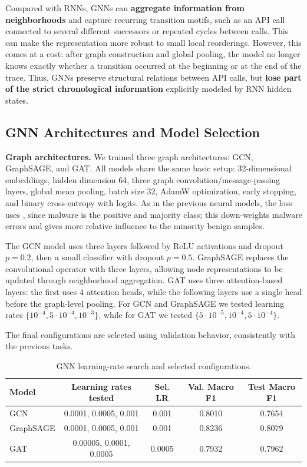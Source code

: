 Compared with RNNs, GNNs can \textbf{aggregate information from neighborhoods} and capture recurring transition motifs, such as an API call connected to several different successors or repeated cycles between calls. This can make the representation more robust to small local reorderings. However, this comes at a cost: after graph construction and global pooling, the model no longer knows exactly whether a transition occurred at the beginning or at the end of the trace. Thus, GNNs preserve structural relations between API calls, but \textbf{lose part of the strict chronological information} explicitly modeled by RNN hidden states.

\subsection{GNN Architectures and Model Selection} \label{subsec:task4_models}

\textbf{Graph architectures.} We trained three graph architectures: GCN, GraphSAGE, and GAT. All models share the same basic setup: 32-dimensional embeddings, hidden dimension 64, three graph convolution/message-passing layers, global mean pooling, batch size 32, AdamW optimization, early stopping, and binary cross-entropy with logits. As in the previous neural models, the loss uses , since malware is the positive and majority class; this down-weights malware errors and gives more relative influence to the minority benign samples.

The GCN model uses three  layers followed by ReLU activations and dropout $p=0.2$, then a small classifier with dropout $p=0.5$. GraphSAGE replaces the convolutional operator with three  layers, allowing node representations to be updated through neighborhood aggregation. GAT uses three attention-based layers: the first  uses 4 attention heads, while the following layers use a single head before the graph-level pooling. For GCN and GraphSAGE we tested learning rates $\{10^{-4}, 5\cdot10^{-4}, 10^{-3}\}$, while for GAT we tested $\{5\cdot10^{-5}, 10^{-4}, 5\cdot10^{-4}\}$.

The final configurations are selected using validation behavior, consistently with the previous tasks.

\begin{table}[H]
\small
\centering
\setlength{\tabcolsep}{5pt}
\renewcommand{\arraystretch}{1.05}
\caption{GNN learning-rate search and selected configurations.}
\label{tab:task4_configs}
\begin{tabular*}{\linewidth}{@{\extracolsep{\fill}}lcccc}
\toprule
\textbf{Model} & \textbf{Learning rates tested} & \textbf{Sel. LR} & \textbf{Val. Macro F1} & \textbf{Test Macro F1} \\
\midrule
GCN & 0.0001, 0.0005, 0.001 & 0.001 & 0.8010 & 0.7654 \\
GraphSAGE & 0.0001, 0.0005, 0.001 & 0.001 & 0.8236 & 0.8079 \\
GAT & 0.00005, 0.0001, 0.0005 & 0.0005 & 0.7932 & 0.7962 \\
\bottomrule
\end{tabular*}
\end{table}

